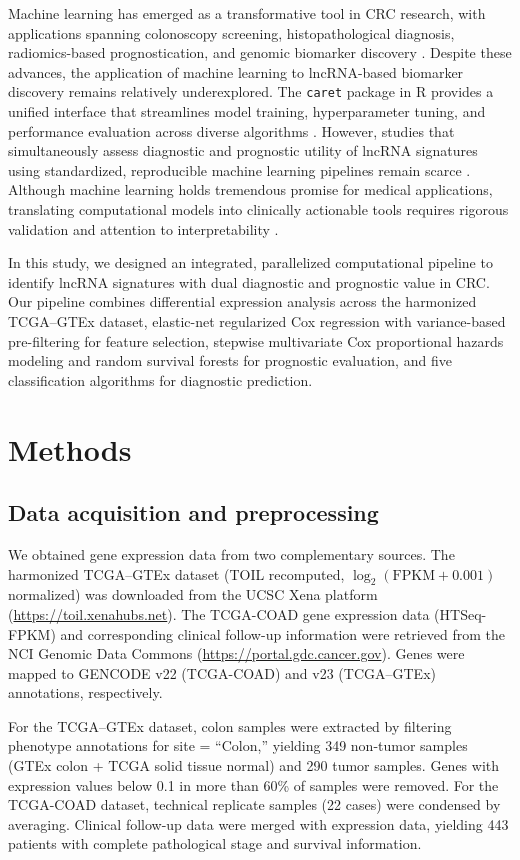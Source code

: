 \documentclass[11pt,a4paper]{article}
\begin{document}
Machine learning has emerged as a transformative tool in CRC research, with applications spanning colonoscopy screening, histopathological diagnosis, radiomics-based prognostication, and genomic biomarker discovery \citep{RN13}. Despite these advances, the application of machine learning to lncRNA-based biomarker discovery remains relatively underexplored. The \texttt{caret} package in R provides a unified interface that streamlines model training, hyperparameter tuning, and performance evaluation across diverse algorithms \citep{RN16}. However, studies that simultaneously assess diagnostic and prognostic utility of lncRNA signatures using standardized, reproducible machine learning pipelines remain scarce \citep{RN18}. Although machine learning holds tremendous promise for medical applications, translating computational models into clinically actionable tools requires rigorous validation and attention to interpretability \citep{RN19}.

In this study, we designed an integrated, parallelized computational pipeline to identify lncRNA signatures with dual diagnostic and prognostic value in CRC. Our pipeline combines differential expression analysis across the harmonized TCGA--GTEx dataset, elastic-net regularized Cox regression with variance-based pre-filtering for feature selection, stepwise multivariate Cox proportional hazards modeling and random survival forests for prognostic evaluation, and five classification algorithms for diagnostic prediction.

\section{Methods}

\subsection{Data acquisition and preprocessing}

We obtained gene expression data from two complementary sources. The harmonized TCGA--GTEx dataset (TOIL recomputed, $\log_2(\text{FPKM}+0.001)$ normalized) was downloaded from the UCSC Xena platform (\url{https://toil.xenahubs.net}). The TCGA-COAD gene expression data (HTSeq-FPKM) and corresponding clinical follow-up information were retrieved from the NCI Genomic Data Commons (\url{https://portal.gdc.cancer.gov}). Genes were mapped to GENCODE v22 (TCGA-COAD) and v23 (TCGA--GTEx) annotations, respectively.

For the TCGA--GTEx dataset, colon samples were extracted by filtering phenotype annotations for site = ``Colon,'' yielding 349 non-tumor samples (GTEx colon + TCGA solid tissue normal) and 290 tumor samples. Genes with expression values below 0.1 in more than 60\% of samples were removed. For the TCGA-COAD dataset, technical replicate samples (22 cases) were condensed by averaging. Clinical follow-up data were merged with expression data, yielding 443 patients with complete pathological stage and survival information.
\end{document}
